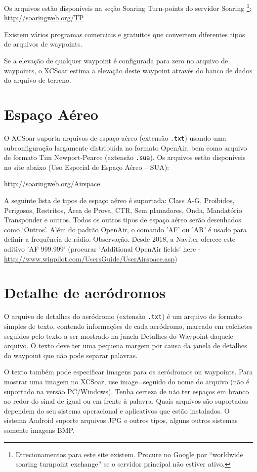 Os arquivos estão disponíveis na seção Soaring Turn-points do servidor Soaring \footnote{Direcionamentos para este site existem.  Procure no Google por “worldwide soaring turnpoint exchange” se o servidor principal não estiver ativo.}: \url{http://soaringweb.org/TP}

Existem vários programas comerciais e gratuitos que convertem diferentes tipos de arquivos de waypoints.

Se a elevação de qualquer waypoint é configurada para zero no arquivo de waypoints, o XCSoar estima a elevação deste waypoint através do banco de dados do arquivo de terreno.

\section{Espaço Aéreo}

O XCSoar suporta arquivos de espaço aéreo (extensão \verb|.txt|) usando uma subconfiguração largamente distribuída no formato OpenAir, bem como arquivo de formato Tim Newport-Pearce  (extensão \verb|.sua|). Os arquivos estão disponíveis no site abaixo (Uso Especial de Espaço Aéreo – SUA):

\url{http://soaringweb.org/Airspace}

A seguinte lista de tipos de espaço aéreo é suportada: Class A-G, Proibidos, Perigosos, Restritos, Área de Prova, CTR, Sem planadores, Onda, Mandatório Transponder e outros.  Todos os outros tipos de espaço aéreo serão desenhados como ‘Outros’.
Além do padrão OpenAir, o comando 'AF' ou 'AR' é usado para definir a frequência de rádio.
Observação. Desde 2018, a Naviter oferece este aditivo 'AF 999.999' (procurar 'Additional OpenAir fields' here - \url{http://www.winpilot.com/UsersGuide/UserAirspace.asp})

\section{Detalhe de aeródromos}\label{sec:airfield-details}

O arquivo de detalhes do aeródromo (extensão \verb|.txt|) é um arquivo de formato simples de texto, contendo informações de cada aeródromo, marcado em colchetes seguidos pelo texto a ser mostrado na janela Detalhes do Waypoint daquele arquivo.  O texto deve ter uma pequena margem por causa da janela de detalhes do waypoint que não pode separar palavras.

O texto também pode especificar imagens para os aeródromos ou waypoints.  Para mostrar uma imagem no XCSoar, use image=seguido do nome do arquivo (não é suportado na versão PC/Windows).  Tenha certeza de não ter espaços em branco ao redor do sinal de igual ou em frente à palavra.  Quais arquivos são suportados dependem do seu sistema operacional e aplicativos que estão instalados.  O sistema Android suporte arquivos JPG e outros tipos, alguns outros sistemas somente imagens BMP.

